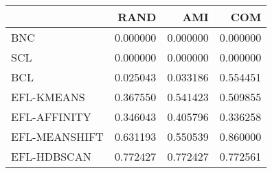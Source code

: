 \begin{tabular}{lrrr}
\toprule
 & RAND & AMI & COM \\
\midrule
BNC & 0.000000 & 0.000000 & 0.000000 \\
SCL & 0.000000 & 0.000000 & 0.000000 \\
BCL & 0.025043 & 0.033186 & 0.554451 \\
EFL-KMEANS & 0.367550 & 0.541423 & 0.509855 \\
EFL-AFFINITY & 0.346043 & 0.405796 & 0.336258 \\
EFL-MEANSHIFT & 0.631193 & 0.550539 & 0.860000 \\
EFL-HDBSCAN & 0.772427 & 0.772427 & 0.772561 \\
\bottomrule
\end{tabular}
